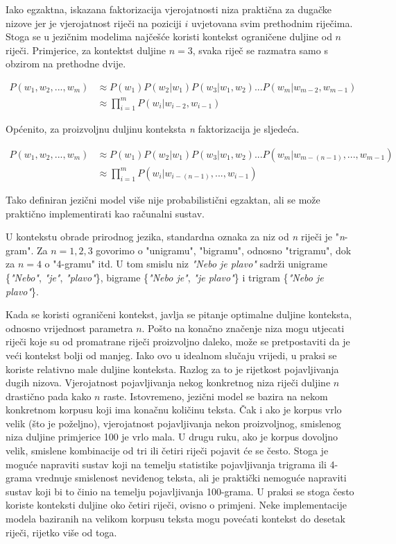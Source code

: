\documentclass[times, utf8, diplomski, numeric]{fer}
\begin{document}
Iako egzaktna, iskazana faktorizacija vjerojatnosti niza praktična za dugačke nizove jer je vjerojatnost riječi na poziciji $i$ uvjetovana svim prethodnim riječima. Stoga se u jezičnim modelima najčešće koristi kontekst ograničene duljine od $n$ riječi. Primjerice, za kontektst duljine $n = 3$, svaka riječ se razmatra samo s obzirom na prethodne dvije.

\begin{align*}
P(w_1, w_2, ... , w_m)
  &\approx P(w_1) P(w_2 | w_1) P(w_3 | w_1, w_2)  ... P(w_m | w_{m - 2}, w_{m - 1}) \\
  &\approx \prod_{i = 1}^m{P(w_i | w_{i - 2}, w_{i - 1})}
\end{align*}

Općenito, za proizvoljnu duljinu konteksta \textit{n} faktorizacija je sljedeća.

\begin{align*}
P(w_1, w_2, ... , w_m)
  &\approx P(w_1) P(w_2 | w_1) P(w_3 | w_1, w_2)  ... P(w_m | w_{m - (n - 1)}, ... , w_{m - 1}) \\
  &\approx \prod_{i = 1}^m{P(w_i | w_{i - (n - 1)}, ... , w_{i - 1})}
\end{align*}

Tako definiran jezični model više nije probabilistični egzaktan, ali se može praktično implementirati kao računalni sustav.

U kontekstu obrade prirodnog jezika, standardna oznaka za niz od \textit{n} riječi je "\textit{n}-gram". Za $n=1, 2, 3$ govorimo o "unigramu", "bigramu", odnosno "trigramu", dok za $n=4$ o "4-gramu" itd. U tom smislu niz \textit{"Nebo je plavo"} sadrži unigrame \{\textit{"Nebo"}, \textit{"je"}, \textit{"plavo"}\}, bigrame \{\textit{"Nebo je"}, \textit{"je plavo"}\} i trigram \{\textit{"Nebo je plavo"}\}.

Kada se koristi ograničeni kontekst, javlja se pitanje optimalne duljine konteksta, odnosno vrijednost parametra $n$. Pošto na konačno značenje niza mogu utjecati riječi koje su od promatrane riječi proizvoljno daleko, može se pretpostaviti da je veći kontekst bolji od manjeg. Iako ovo u idealnom slučaju vrijedi, u praksi se koriste relativno male duljine konteksta. Razlog za to je rijetkost pojavljivanja dugih nizova. Vjerojatnost pojavljivanja nekog konkretnog niza riječi duljine $n$ drastično pada kako $n$ raste. Istovremeno, jezični model se bazira na nekom konkretnom korpusu koji ima konačnu količinu teksta. Čak i ako je korpus vrlo velik (što je poželjno), vjerojatnost pojavljivanja nekon proizvoljnog, smislenog niza duljine primjerice 100 je vrlo mala. U drugu ruku, ako je korpus dovoljno velik, smislene kombinacije od tri ili četiri riječi pojavit će se često. Stoga je moguće napraviti sustav koji na temelju statistike pojavljivanja trigrama ili 4-grama vrednuje smislenost neviđenog teksta, ali je praktički nemoguće napraviti sustav koji bi to činio na temelju pojavljivanja 100-grama. U praksi se stoga često koriste konteksti duljine oko četiri riječi, ovisno o primjeni. Neke implementacije modela baziranih na velikom korpusu teksta mogu povećati kontekst do desetak riječi, rijetko više od toga. 
\end{document}
